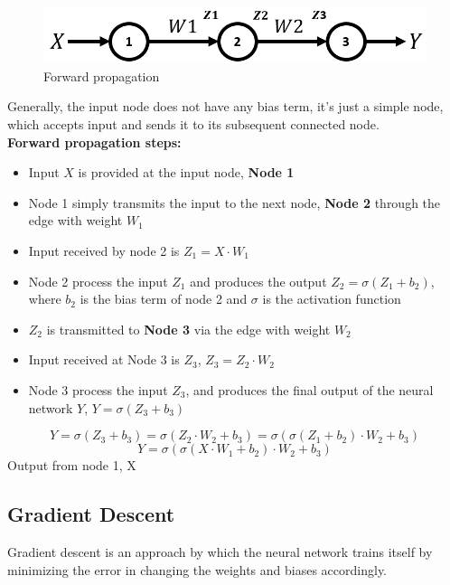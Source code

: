 \documentclass[12pt,a4paper,bold]{thesis}
\theoremstyle{thm}
\theoremstyle{definition}
\begin{document}
\begin{figure}[H]
	\centering
   \includegraphics[scale=0.56]{Images/34.png} 
   \caption{Forward propagation }
\end{figure}

Generally, the input node does not have any bias term, it's just a simple node, which accepts input and sends it to its subsequent connected node.\\ 
\textbf{Forward propagation steps:}\\
\begin{itemize}
	\item Input $X$ is provided at the input node, \textbf{Node 1}
	\item Node 1 simply transmits the input to the next node, \textbf{Node 2} through the edge with weight $W_1$ 
	\item Input received by node 2 is $Z_1 = X\cdot W_1$ 
	\item Node 2 process the input $Z_1$ and produces the output $Z_2=\sigma(Z_1+b_2)$, where $b_2$ is the bias term of node 2 and $\sigma$ is the activation function
	\item $Z_2$ is transmitted to \textbf{Node 3} via the edge with weight $W_2$
	\item Input received at Node 3 is $Z_3$, $Z_3=Z_2 \cdot W_2$
	\item Node 3 process the input $Z_3$, and produces the final output of the neural network $Y$, $Y=\sigma(Z_3 + b_3)$
\end{itemize}
\[Y=\sigma(Z_3 + b_3)=\sigma(Z_2 \cdot W_2 + b_3)=\sigma(\sigma(Z_1+b_2) \cdot W_2 + b_3)\]
\[Y=\sigma(\sigma(X\cdot W_1+b_2) \cdot W_2 + b_3)\]
Output from node 1, X

\subsection{Gradient Descent}
Gradient descent is an approach by which the neural network trains itself by minimizing the error in changing the weights and biases accordingly.
\end{document}
